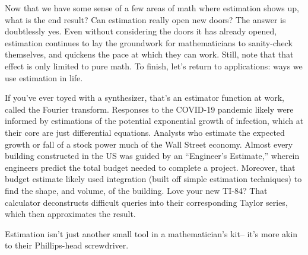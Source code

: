 \documentclass{article}
\begin{document}
Now that we have some sense of a few areas of math where estimation shows up, what is the end result? Can estimation really open new doors? The answer is doubtlessly yes. Even without considering the doors it has already opened, estimation continues to lay the groundwork for mathematicians to sanity-check themselves, and quickens the pace at which they can work. Still, note that that effect is only limited to pure math. To finish, let’s return to applications: ways we use estimation in life.

If you’ve ever toyed with a synthesizer, that’s an estimator function at work, called the Fourier transform. Responses to the COVID-19 pandemic likely were informed by estimations of the potential exponential growth of infection, which at their core are just differential equations. Analysts who estimate the expected growth or fall of a stock power much of the Wall Street economy. Almost every building constructed in the US was guided by an ``Engineer's Estimate,'' wherein engineers predict the total budget needed to complete a project. Moreover, that budget estimate likely used integration (built off simple estimation techniques) to find the shape, and volume, of the building. Love your new TI-84? That calculator deconstructs difficult queries into their corresponding Taylor series, which then approximates the result.

Estimation isn’t just another small tool in a mathematician's kit– it’s more akin to their Phillips-head screwdriver.
\end{document}
